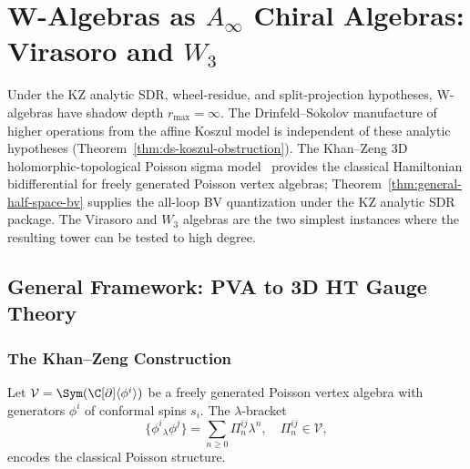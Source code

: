 \section{W-Algebras as $A_\infty$ Chiral Algebras: Virasoro and $W_3$}
\label{sec:W-algebras}

Under the KZ analytic SDR, wheel-residue, and split-projection
hypotheses, W-algebras have shadow depth $r_{\max}=\infty$. The
Drinfeld--Sokolov manufacture of higher operations from the affine
Koszul model is independent of these analytic hypotheses
(Theorem~\ref{thm:ds-koszul-obstruction}). The Khan--Zeng 3D
holomorphic-topological Poisson sigma model~\cite{KZ25} provides the
classical Hamiltonian bidifferential for freely generated Poisson
vertex algebras; Theorem~\ref{thm:general-half-space-bv} supplies the
all-loop BV quantization under the KZ analytic SDR package. The
Virasoro and $W_3$ algebras are the two simplest instances
where the resulting tower can be tested to high degree.

\subsection{General Framework: PVA to 3D HT Gauge Theory}
\label{subsec:PVA-to-3DHT}

\subsubsection{The Khan--Zeng Construction}

Let $\mathcal{V} = \Sym(\C[\partial]\langle \phi^i \rangle)$ be a freely generated Poisson vertex algebra with generators $\phi^i$ of conformal spins $s_i$. The $\lambda$-bracket
\[
\{\phi^i{}_\lambda \phi^j\} = \sum_{n \geq 0} \Pi^{ij}_n \lambda^n, \quad \Pi^{ij}_n \in \mathcal{V},
\]
encodes the classical Poisson structure.

